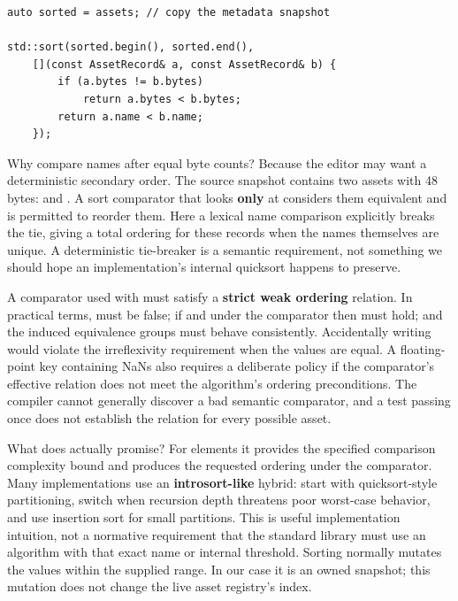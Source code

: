 \begin{verbatim}
auto sorted = assets; // copy the metadata snapshot

std::sort(sorted.begin(), sorted.end(),
    [](const AssetRecord& a, const AssetRecord& b) {
        if (a.bytes != b.bytes)
            return a.bytes < b.bytes;
        return a.name < b.name;
    });
\end{verbatim}

Why compare names after equal byte counts? Because the editor may want a deterministic secondary order. The source snapshot contains two assets with 48 bytes:  and . A sort comparator that looks \textbf{only} at  considers them equivalent and is permitted to reorder them. Here a lexical name comparison explicitly breaks the tie, giving a total ordering for these records when the names themselves are unique. A deterministic tie-breaker is a semantic requirement, not something we should hope an implementation's internal quicksort happens to preserve.

A comparator used with  must satisfy a \textbf{strict weak ordering} relation. In practical terms,  must be false; if  and  under the comparator then  must hold; and the induced equivalence groups must behave consistently. Accidentally writing  would violate the irreflexivity requirement when the values are equal. A floating-point key containing NaNs also requires a deliberate policy if the comparator's effective relation does not meet the algorithm's ordering preconditions. The compiler cannot generally discover a bad semantic comparator, and a test passing once does not establish the relation for every possible asset.

What does  actually promise? For  elements it provides the specified comparison complexity bound and produces the requested ordering under the comparator. Many implementations use an \textbf{introsort-like} hybrid: start with quicksort-style partitioning, switch when recursion depth threatens poor worst-case behavior, and use insertion sort for small partitions. This is useful implementation intuition, not a normative requirement that the standard library must use an algorithm with that exact name or internal threshold. Sorting normally mutates the values within the supplied range. In our case it is an owned snapshot; this mutation does not change the live asset registry's index.


